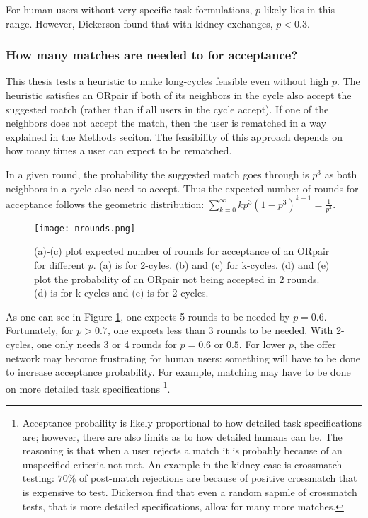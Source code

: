 \documentclass[main.tex]{subfiles}
\begin{document}
For human users without very specific task formulations, $p$ likely lies in this range. However, Dickerson \cite{Dick} \cite{Dick3} found that with kidney exchanges, $p < 0.3$.

\subsubsection{How many matches are needed to for acceptance?}\label{sec:nrounds}
This thesis tests a heuristic to make long-cycles feasible even without high $p$. The heuristic satisfies an ORpair if both of its neighbors in the cycle also accept the suggested match (rather than if all users in the cycle accept). If one of the neighbors does not accept the match, then the user is rematched in a way explained in the Methods seciton. The feasibility of this approach depends on how many times a user can expect to be rematched.

In a given round, the probability the suggested match goes through is $p^3$ as both neighbors in a cycle also need to accept. Thus the expected number of rounds for acceptance follows the geometric distribution: $\sum_{k=0}^{\infty} k p^3 (1 - p^3)^{k-1} = \frac{1}{p^3}$.

\begin{figure}
  \texttt{[image: nrounds.png]}
  \caption{(a)-(c) plot expected number of rounds for acceptance of an ORpair for different $p$. (a) is for 2-cyles. (b) and (c) for k-cycles. (d) and (e) plot the probability of an ORpair not being accepted in 2 rounds. (d) is for k-cycles and (e) is for 2-cycles.}
  \label{nrounds}
\end{figure}

As one can see in Figure \ref{nrounds}, one expects 5 rounds to be needed by $p = 0.6$. Fortunately, for $p > 0.7$, one expcets less than 3 rounds to be needed. With 2-cycles, one only needs 3 or 4 rounds for $p = 0.6$ or $0.5$. For lower $p$, the offer network may become frustrating for human users: something will have to be done to increase acceptance probability. For example, matching may have to be done on more detailed task specifications \footnote{Acceptance probaility is likely proportional to how detailed task specifications are; however, there are also limits as to how detailed humans can be. The reasoning is that when a user rejects a match it is probably because of an unspecified criteria not met. An example in the kidney case is crossmatch testing: $70\%$ of post-match rejections are because of positive crossmatch that is expensive to test. Dickerson \cite{Dick} find that even a random sapmle of crossmatch tests, that is more detailed specifications, allow for many more matches.}.
\end{document}

